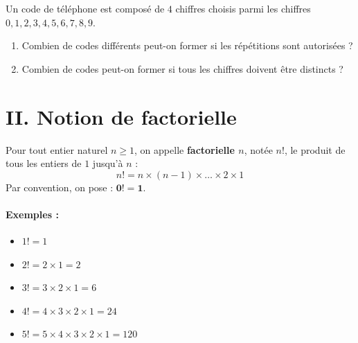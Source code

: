 \documentclass[12pt,a4paper]{article}
\begin{document}
\begin{tcolorbox}[colback=yellow!5!white,colframe=myred,title=\textbf{Exercice d'application 1}]
Un code de téléphone est composé de $4$ chiffres choisis parmi les chiffres $0, 1, 2, 3, 4, 5, 6, 7, 8, 9$.
\begin{enumerate}
    \item Combien de codes différents peut-on former si les répétitions sont autorisées ?
    \item Combien de codes peut-on former si tous les chiffres doivent être distincts ?
\end{enumerate}
\end{tcolorbox}


\section*{\color{myred}II. Notion de factorielle}

\begin{tcolorbox}[colback=red!5!white,colframe=myred,title=\textbf{Définition}]
Pour tout entier naturel $n \ge 1$, on appelle \textbf{factorielle $n$}, notée $n!$, le produit de tous les entiers de $1$ jusqu'à $n$ :
\[
n! = n \times (n-1) \times \dots \times 2 \times 1
\]
Par convention, on pose : $\mathbf{0! = 1}$.
\end{tcolorbox}

\paragraph{Exemples :}
\begin{itemize}[label=$\bullet$]
    \item $1! = 1$
    \item $2! = 2 \times 1 = 2$
    \item $3! = 3 \times 2 \times 1 = 6$
    \item $4! = 4 \times 3 \times 2 \times 1 = 24$
    \item $5! = 5 \times 4 \times 3 \times 2 \times 1 = 120$
\end{itemize}
\end{document}
